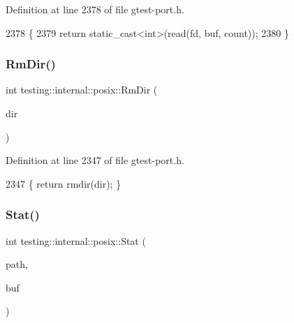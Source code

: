 Definition at line 2378 of file gtest-\/port.\+h.


\begin{DoxyCode}
2378                                                        \{
2379   \textcolor{keywordflow}{return} \textcolor{keyword}{static\_cast<}\textcolor{keywordtype}{int}\textcolor{keyword}{>}(read(fd, buf, count));
2380 \}
\end{DoxyCode}
\mbox{\label{namespacetesting_1_1internal_1_1posix_acbad5d4ea5b73fd1765f5f760642932a}} 
\subsubsection{\texorpdfstring{Rm\+Dir()}{RmDir()}}
{\footnotesize\ttfamily int testing\+::internal\+::posix\+::\+Rm\+Dir (\begin{DoxyParamCaption}\item[{const char $\ast$}]{dir }\end{DoxyParamCaption})\hspace{0.3cm}{\ttfamily [inline]}}



Definition at line 2347 of file gtest-\/port.\+h.


\begin{DoxyCode}
2347 \{ \textcolor{keywordflow}{return} rmdir(dir); \}
\end{DoxyCode}
\mbox{\label{namespacetesting_1_1internal_1_1posix_a2b87b7ff647a128614daf50667eb9304}} 
\subsubsection{\texorpdfstring{Stat()}{Stat()}}
{\footnotesize\ttfamily int testing\+::internal\+::posix\+::\+Stat (\begin{DoxyParamCaption}\item[{const char $\ast$}]{path,  }\item[{\hyperlink{namespacetesting_1_1internal_1_1posix_a8eb9f08d3af29941c2d2a964cfff3ecb}{Stat\+Struct} $\ast$}]{buf }\end{DoxyParamCaption})\hspace{0.3cm}{\ttfamily [inline]}}



